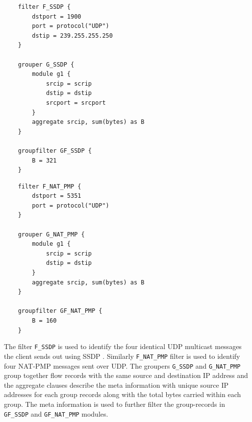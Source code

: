 \begin{center}
\begin{minipage}{.44\textwidth}
	\begin{lstlisting}
	filter F_SSDP {
		dstport = 1900
		port = protocol("UDP")	
		dstip = 239.255.255.250
	}

	grouper G_SSDP {
		module g1 {
			srcip = scrip
			dstip = dstip
			srcport = srcport
		}
		aggregate srcip, sum(bytes) as B
	}

	groupfilter GF_SSDP {
		B = 321
	}
	\end{lstlisting}
\end{minipage}
\hfill
\begin{minipage}{.44\textwidth}
	\begin{lstlisting}
	filter F_NAT_PMP {
		dstport = 5351
		port = protocol("UDP")	
	}

	grouper G_NAT_PMP {
		module g1 {
			srcip = scrip
			dstip = dstip
		}
		aggregate srcip, sum(bytes) as B
	}

	groupfilter GF_NAT_PMP {
		B = 160
	}
	\end{lstlisting}
\end{minipage}
\end{center}
The filter \texttt{F\_SSDP} is used to identify the four identical \ac{UDP} multicast messages the client sends out using \ac{SSDP} \cite{mbodlaender:2005}. Similarly \texttt{F\_NAT\_PMP} filter is used to identify four \ac{NAT-PMP} \cite{draft-cheshire-nat-pmp-03} messages sent over UDP. The groupers \texttt{G\_SSDP} and \texttt{G\_NAT\_PMP} group together flow records with the same source and destination IP address and the aggregate clauses describe the meta information with unique source IP addresses for each group records along with the total bytes carried within each group. The meta information is used to further filter the group-records in \texttt{GF\_SSDP} and \texttt{GF\_NAT\_PMP} modules. 

